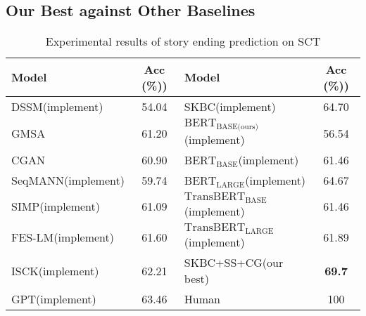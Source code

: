 \subsection{Our Best against Other Baselines}
\label{sec:result_all}
\begin{table}
 \scriptsize
\centering
\begin{tabular}{lclc}
\hline
$\textbf{Model}$ & Acc (\%))& $\textbf{Model}$ & Acc (\%))\\
\hline
\hline
DSSM(implement)& 54.04&SKBC(implement)&64.70\\
GMSA& 61.20&$\text{BERT}_\text{BASE(ours)}$(implement)&56.54\\
CGAN& 60.90&$\text{BERT}_\text{BASE}$(implement)&61.46 \\
SeqMANN(implement)& 59.74&$\text{BERT}_\text{LARGE}$(implement)&64.67\\
SIMP(implement)&61.09&$\text{TransBERT}_\text{BASE}$(implement)&61.46\\
FES-LM(implement)&61.60&$\text{TransBERT}_\text{LARGE}$(implement)&61.89\\
ISCK(implement)& 62.21&SKBC+SS+CG(our best)&\bf{69.7} \\
GPT(implement)& 63.46&Human& 100\\
\hline
%
\end{tabular}
\caption{Experimental results of story ending prediction on SCT}
\label{tab:all-models}
\end{table}

